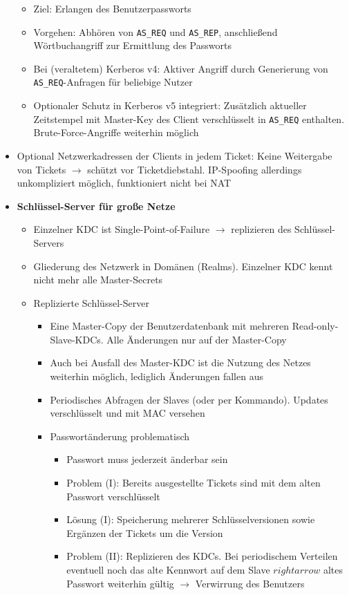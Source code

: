 \begin{itemize}
\begin{itemize}
		\item Ziel: Erlangen des Benutzerpassworts
		\item Vorgehen: Abhören von \texttt{AS\_REQ} und \texttt{AS\_REP}, anschließend Wörtbuchangriff zur Ermittlung des Passworts
		\item Bei (veraltetem) Kerberos v4: Aktiver Angriff durch Generierung von \texttt{AS\_REQ}-Anfragen für beliebige Nutzer
		\item Optionaler Schutz in Kerberos v5 integriert: Zusätzlich aktueller Zeitstempel mit Master-Key des Client verschlüsselt in \texttt{AS\_REQ} enthalten. Brute-Force-Angriffe weiterhin möglich
	\end{itemize}
	\item Optional Netzwerkadressen der Clients in jedem Ticket: Keine Weitergabe von Tickets \(\rightarrow\) schützt vor Ticketdiebstahl. IP-Spoofing allerdings unkompliziert möglich, funktioniert nicht bei NAT
	\item \textbf{Schlüssel-Server für große Netze}
	\begin{itemize}
		\item Einzelner KDC ist Single-Point-of-Failure \(\rightarrow\) replizieren des Schlüssel-Servers
		\item Gliederung des Netzwerk in Domänen (Realms). Einzelner KDC kennt nicht mehr alle Master-Secrets
		\item Replizierte Schlüssel-Server
		\begin{itemize}
			\item Eine Master-Copy der Benutzerdatenbank mit mehreren Read-only-Slave-KDCs. Alle Änderungen nur auf der Master-Copy
			\item Auch bei Ausfall des Master-KDC ist die Nutzung des Netzes weiterhin möglich, lediglich Änderungen fallen aus
			\item Periodisches Abfragen der Slaves (oder per Kommando). Updates verschlüsselt und mit MAC versehen
			\item Passwortänderung problematisch
			\begin{itemize}
				\item Passwort muss jederzeit änderbar sein
				\item Problem (I): Bereits ausgestellte Tickets sind mit dem alten Passwort verschlüsselt
				\item Lösung (I): Speicherung mehrerer Schlüsselversionen sowie Ergänzen der Tickets um die Version
				\item Problem (II): Replizieren des KDCs. Bei periodischem Verteilen eventuell noch das alte Kennwort auf dem Slave \(rightarrow\) altes Passwort weiterhin gültig \(\rightarrow\) Verwirrung des Benutzers

\end{itemize}
\end{itemize}
\end{itemize}
\end{itemize}
